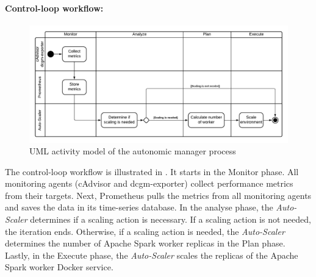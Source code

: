 \paragraph{Control-loop workflow:}
\begin{figure}[h]
\centering
\includegraphics[scale=0.50]{images/05_conceptual_design/autonomic_manager/autonomic_manager_workflow}
\caption{UML activity model of the autonomic manager process}
\label{fig:05_am_monitoring_loop_workflow}
\end{figure}
The control-loop workflow is illustrated in .
It starts in the Monitor phase. All monitoring agents (cAdvisor and dcgm-exporter) collect performance metrics from their targets. Next, Prometheus pulls the metrics from all monitoring agents and saves the data in its time-series database.
In the analyse phase, the \textit{Auto-Scaler} determines if a scaling action is necessary. If a scaling action is not needed, the iteration ends.
Otherwise, if a scaling action is needed, the \textit{Auto-Scaler} determines the number of Apache Spark worker replicas in the Plan phase.
Lastly, in the Execute phase, the \textit{Auto-Scaler} scales the replicas of the Apache Spark worker Docker service.


